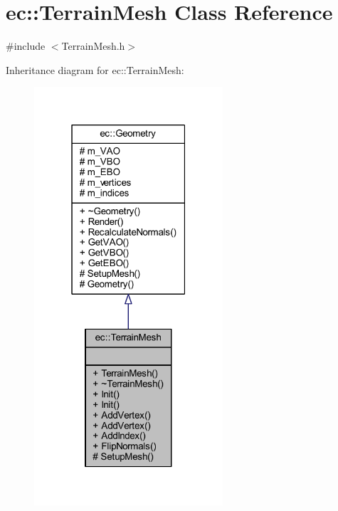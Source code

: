 \hypertarget{classec_1_1_terrain_mesh}{}\section{ec\+:\+:Terrain\+Mesh Class Reference}
\label{classec_1_1_terrain_mesh}


{\ttfamily \#include $<$Terrain\+Mesh.\+h$>$}



Inheritance diagram for ec\+:\+:Terrain\+Mesh\+:
\nopagebreak
\begin{figure}[H]
\begin{center}
\leavevmode
\includegraphics[width=199pt]{classec_1_1_terrain_mesh__inherit__graph}
\end{center}
\end{figure}


